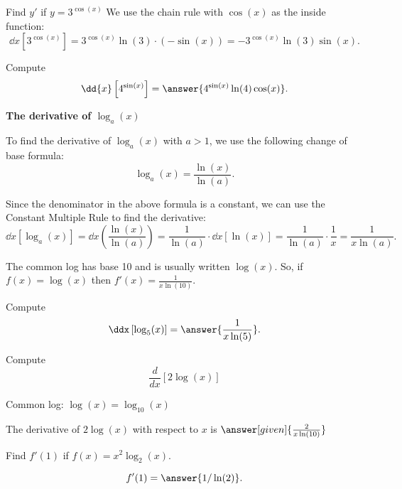 \documentclass{ximera}
\begin{document}
\begin{example}
Find $y'$ if $y = 3^{\cos(x)}$
We use the chain rule with $\cos(x)$ as the inside function:
\[
\dd{x} \left[3^{\cos(x)}\right] = 3^{\cos(x)} \ln(3) \cdot (-\sin(x)) = -3^{\cos(x)} \ln(3) \sin(x).
\]
\end{example}

\begin{problem}
Compute
\[
\dd{x} \left[ 4^{\sin(x)}\right] = \answer{4^{\sin(x)}\ln(4) \cos(x)}.
\]
\end{problem}



\begin{center}
\textbf{The derivative of $\log_a(x)$}
\end{center}

To find the derivative of $\log_a(x)$ with $a > 1$, we use the following change of base formula:
\[
\log_a(x) = \frac{\ln(x)}{\ln(a)}.
\]

Since the denominator in the above formula is a constant, we can use the Constant Multiple Rule to find the derivative:
\[
\dd{x} \left[\log_a(x)\right] = \dd{x} \left(\frac{\ln(x)}{\ln(a)}\right) = \frac{1}{\ln(a)}\cdot \dd{x} \left[\ln(x)\right] = \frac{1}{\ln(a)} \cdot \frac{1}{x} = \frac{1}{x\ln(a)}.
\]


\begin{example} %
The common log has base 10 and is usually written $\log(x)$.
So, if $f(x) = \log(x)$ then $f'(x) = \frac{1}{x\ln(10)}.$
\end{example}



\begin{problem}
Compute
\[
\ddx \left[\log_5(x)\right] = \answer{\frac{1}{x\ln(5)}}.
\]
\end{problem}


\begin{problem} %
  Compute 
  \[
  \frac{d}{dx} \left[2\log(x)\right]
  \]
  
		\begin{hint}
		  Common log: $\log(x) = \log_{10}(x)$ 
		\end{hint}
	
		
		The derivative of $2\log(x)$ with respect to $x$ is
		 $\answer[given]{\frac{2}{x\ln(10)}}$
	
\end{problem}


\begin{problem}
Find $f'(1)$ if $f(x) = x^2 \log_2(x)$.

\[
f'(1) = \answer{1/\ln(2)}.
\]

\end{problem}
\end{document}
